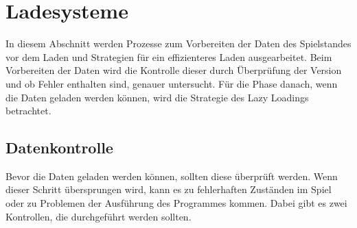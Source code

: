 \section{Ladesysteme}\label{sect:ladesysteme}
In diesem Abschnitt werden Prozesse zum Vorbereiten der Daten des Spielstandes vor dem Laden und Strategien für ein effizienteres Laden ausgearbeitet. Beim Vorbereiten der Daten wird die Kontrolle dieser durch Überprüfung der Version und ob Fehler enthalten sind, genauer untersucht. Für die Phase danach, wenn die Daten geladen werden können, wird die Strategie des Lazy Loadings betrachtet.



\subsection{Datenkontrolle}
Bevor die Daten geladen werden können, sollten diese überprüft werden. Wenn dieser Schritt übersprungen wird, kann es zu fehlerhaften Zuständen im Spiel oder zu Problemen der Ausführung des Programmes kommen. Dabei gibt es zwei Kontrollen, die durchgeführt werden sollten.

